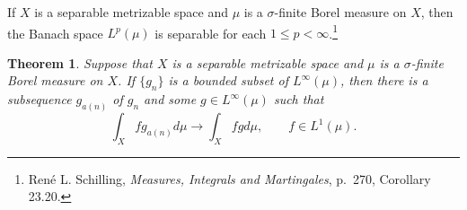 \documentclass{article}
\newtheorem{theorem}{Theorem}
\theoremstyle{definition}
\begin{document}
If $X$ is a separable metrizable space and $\mu$ is a $\sigma$-finite Borel measure on $X$, then
the Banach space $L^p(\mu)$ is separable for each $1 \leq p < \infty$.\footnote{Ren\'e L. Schilling,
{\em Measures, Integrals and Martingales}, p.~270, Corollary 23.20.} 

\begin{theorem}
Suppose that $X$ is a separable metrizable space and $\mu$ is a $\sigma$-finite Borel measure on $X$.
 If $\{g_n\}$ is a bounded subset of $L^\infty(\mu)$, then there is a subsequence $g_{a(n)}$ of $g_n$ and some
$g \in L^\infty(\mu)$ such that
\[
\int_X f g_{a(n)} d\mu \to \int_X f g d\mu, \qquad f \in L^1(\mu).
\] 
\label{subsequence}
\end{theorem}
\end{document}
